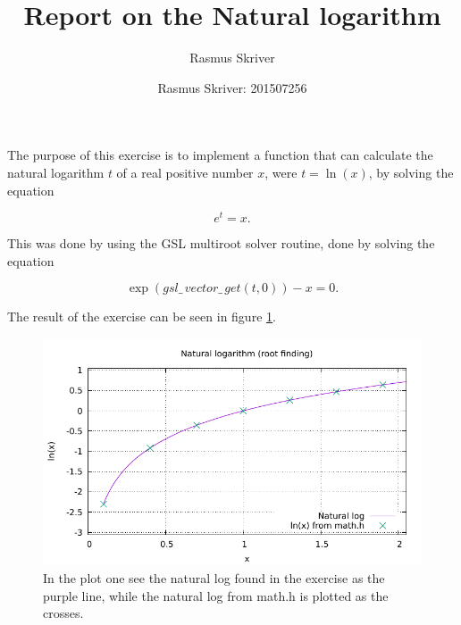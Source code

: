 \documentclass[english,onecolumn]{article}
\begin{document}
\author{Rasmus Skriver}
\title{Report on the Natural logarithm}
\author{Rasmus Skriver: 201507256}

\maketitle

The purpose of this exercise is to implement a function that can calculate the natural logarithm
$t$ of a real positive number $x$, were $t=\ln(x)$, by solving the equation

\begin{equation}
e^t=x.
\end{equation}

This was done by using the GSL multiroot solver routine, done by solving the equation

\begin{equation}
\exp(gsl\_\,vector\_\,get(t,0))-x=0.
\end{equation}

The result of the exercise 
can be seen in figure \ref{fig:nat_log}.

\begin{figure}[h]
\centering
\includegraphics{plot.pdf}
\caption{In the plot one see the natural log found in the exercise as the purple line, while the natural log from math.h is plotted as the crosses.}
\label{fig:nat_log}
\end{figure}
\end{document}

